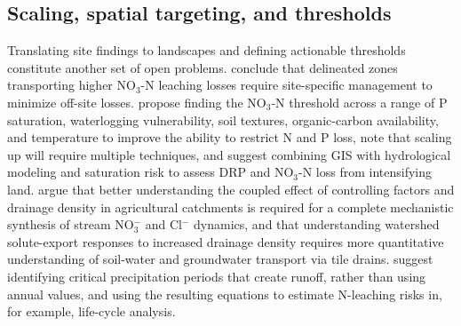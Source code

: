 \documentclass[11pt]{article}
\begin{document}
\subsection{Scaling, spatial targeting, and thresholds}
Translating site findings to landscapes and defining actionable thresholds constitute another set of open problems. \textcite{Bakhsh2005b} conclude that delineated zones transporting higher NO$_3$-N leaching losses require site-specific management to minimize off-site losses. \textcite{Smith2023} propose finding the NO$_3$-N threshold across a range of P saturation, waterlogging vulnerability, soil textures, organic-carbon availability, and temperature to improve the ability to restrict N and P loss, note that scaling up will require multiple techniques, and suggest combining GIS with hydrological modeling and saturation risk to assess DRP and NO$_3$-N loss from intensifying land. \textcite{Kennedy2012} argue that better understanding the coupled effect of controlling factors and drainage density in agricultural catchments is required for a complete mechanistic synthesis of stream NO$_3^-$ and Cl$^-$ dynamics, and that understanding watershed solute-export responses to increased drainage density requires more quantitative understanding of soil-water and groundwater transport via tile drains. \textcite{Salo2006} suggest identifying critical precipitation periods that create runoff, rather than using annual values, and using the resulting equations to estimate N-leaching risks in, for example, life-cycle analysis.
\end{document}
